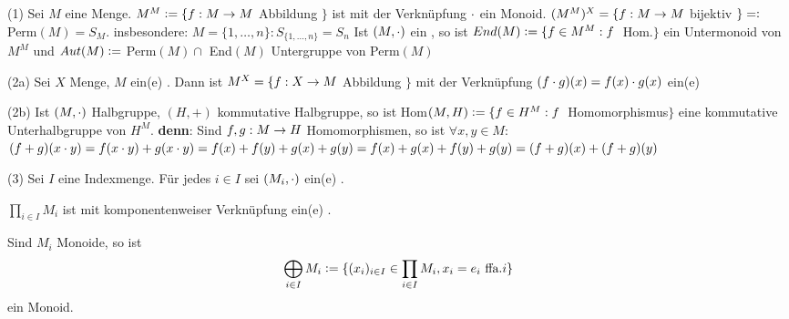 \documentclass[a4paper,10pt,german]{scrbook}
\theoremstyle{saetze}
\theoremstyle{definitionen}
\begin{document}
\begin{enum}
    \item[(1)] Sei $M$ eine Menge. $\\M^M \mathrel{\mathop:}= \{ f:M \rightarrow M$ Abbildung $\}$
    ist mit der Verknüpfung $\cdot$ ein Monoid. $(M^M)^X = \{f: M \rightarrow M$ bijektiv
    $\} =\mathrel{\mathop:}$ Perm$(M) = S_M$. \newline
    insbesondere: $M=\{1,\dots ,n\}: S_{ \{1, \dots, n\} } = S_n$ Ist $(M,\cdot)$
    ein \bla, so ist $End(M) \mathrel{\mathop:}= \{f \in M^M :f\;$ Hom.$\}$ ein Untermonoid
    von $M^M$ und \newline
    $Aut(M) \mathrel{\mathop:}=$ Perm$(M) \cap$ End$(M)$ Untergruppe von Perm$(M)$

    \item[(2a)] Sei $X$ Menge, $M$ ein(e) \bla. Dann ist $M^X = \{f:X \rightarrow M$
    Abbildung $\}$ mit der Verknüpfung $(f\cdot g)(x) = f(x)\cdot g(x)$ ein(e) \bla
    
    \item[(2b)] Ist $(M,\cdot)$ Halbgruppe, $(H,+)$ kommutative Halbgruppe, so
    ist Hom$(M,H) \mathrel{\mathop:}= \{f \in H^M: f\;$ Homomorphismus$\}$ eine kommutative
    Unterhalbgruppe von $H^M$. \newline\textbf{denn}: Sind $f,g: M \rightarrow H$
    Homomorphismen, so ist $\forall x,y \in M$: \newline
    $(f+g)(x\cdot y) = f(x \cdot y) + g(x \cdot y) = f(x) + f(y) + g(x) + g(y) = f(x)
    + g(x) + f(y) + g(y) = (f + g)(x) + (f + g)(y)$

    \item[(3)] Sei $I$ eine Indexmenge. Für jedes $i \in I$ sei $(M_i, \cdot)$
    ein(e) \bla.
    \begin{enum}
        \item $\displaystyle \prod_{i \in I} M_i$ ist mit komponentenweiser
        Verknüpfung ein(e) \bla.
        
        \item Sind $M_i$ Monoide, so ist \[ \bigoplus_{i \in I} M_i \mathrel{\mathop:}= \{ 
        (x_i)_{i \in I} \in \prod_{i \in I} M_i, x_i = e_i \mbox{ ffa.} i\}\]
        ein Monoid.
    \end{enum}
\end{enum}
\end{document}

